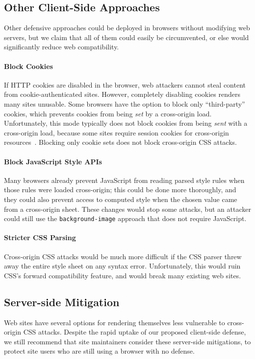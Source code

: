 \documentclass{acm_proc_article-sp}
\begin{document}
\subsection{Other Client-Side Approaches}
Other defensive approaches could be deployed in browsers without
modifying web servers, but we claim that all of them could easily be
circumvented, or else would significantly reduce web compatibility.

\paragraph{Block Cookies}
If HTTP cookies are disabled in the browser, web attackers cannot
steal content from cookie-authenticated sites.  However, completely
disabling cookies renders many sites unusable.  Some browsers have the
option to block only “third-party” cookies, which prevents cookies
from being \emph{set} by a cross-origin load.  Unfortunately, this
mode typically does not block cookies from being \emph{sent} with a
cross-origin load, because some sites require session cookies for
cross-origin resources~\cite{jackson06thirdpartycookies}.  Blocking
only cookie sets does not block cross-origin CSS attacks.

\paragraph{Block JavaScript Style APIs}
Many browsers already prevent JavaScript from reading parsed style
rules when those rules were loaded cross-origin; this could be done
more thoroughly, and they could also prevent access to computed style
when the chosen value came from a cross-origin sheet.  These changes
would stop some attacks, but an attacker could still use the
\texttt{background-image} approach that does not require JavaScript.

\paragraph{Stricter CSS Parsing}
Cross-origin CSS attacks would be much more difficult if the CSS
parser threw away the entire style sheet on any syntax error.
Unfortunately, this would ruin CSS's forward compatibility feature,
and would break many existing web sites.

\subsection{Server-side Mitigation}
Web sites have several options for rendering themselves less
vulnerable to cross-origin CSS attacks.  Despite the rapid uptake of
our proposed client-side defense, we still recommend that site
maintainers consider these server-side mitigations, to protect site
users who are still using a browser with no defense.
\end{document}
